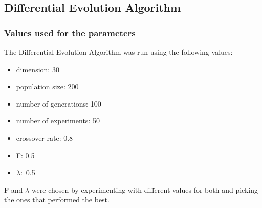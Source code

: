 \documentclass[12pt]{article}
\begin{document}
			\subsection{Differential Evolution Algorithm}
				\subsubsection{Values used for the parameters}
					The Differential Evolution Algorithm was  run using  the following values:
					\begin{itemize}
						\item dimension: 30
						\item population size: 200
						\item number of generations: 100
						\item number of experiments: 50
						\item crossover rate: 0.8
						\item F: 0.5
						\item $\lambda:$ 0.5
					\end{itemize}
				
					F and $\lambda$ were chosen by experimenting with different values for both and picking the ones that performed the best.
					
\end{document}
